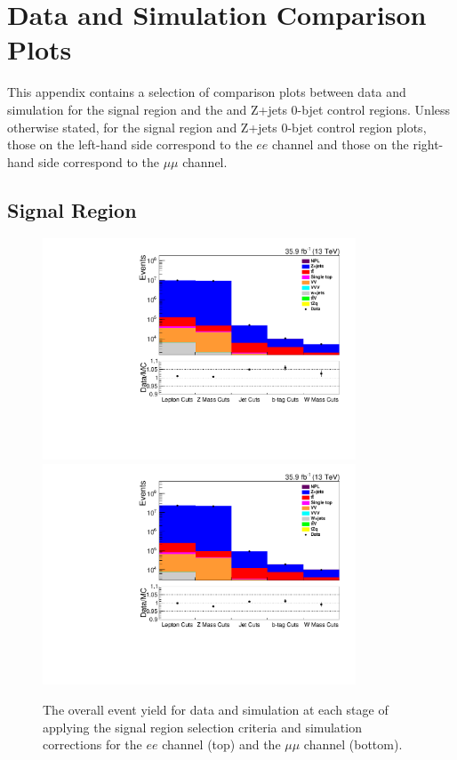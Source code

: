 \chapter{Data and Simulation Comparison Plots}\label{app:plots}
This appendix contains a selection of comparison plots between data and simulation for the signal region and the \ttbar and Z+jets 0-bjet control regions.
Unless otherwise stated, for the signal region and Z+jets 0-bjet control region plots, those on the left-hand side correspond to the $ee$ channel and those on the right-hand side correspond to the $\mu\mu$ channel.

\clearpage
\newpage

\section{Signal Region}\label{appSec:signalRegionPlots}
\begin{figure}[ht]
\centering
\includegraphics[width=0.83\textwidth]{figs/background-estimation/plots/unblinded/prompt_ee_ttbarInc/cutFlow_log.pdf}
\\
\includegraphics[width=0.83\textwidth]{figs/background-estimation/plots/unblinded/prompt_mumu_ttbarInc/cutFlow_log.pdf}
\caption{
The overall event yield for data and simulation at each stage of applying the signal region selection criteria and simulation corrections for the $ee$ channel (top) and the $\mu\mu$ channel (bottom).
}
\label{fig:App_SR_cutFlow}
\end{figure}

